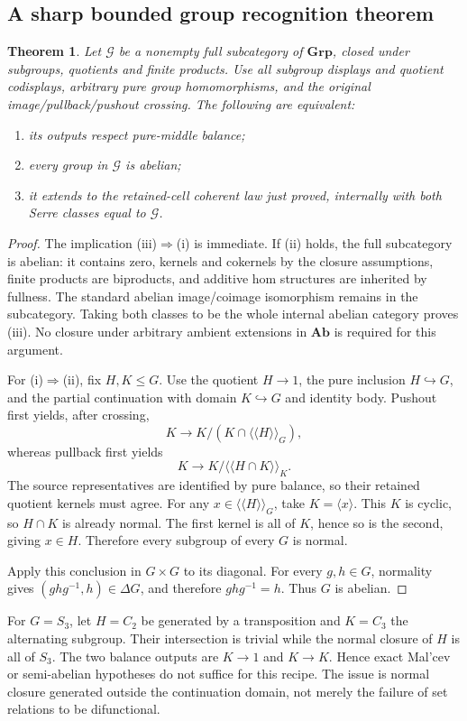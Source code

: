 \documentclass[11pt,a4paper]{article}
\newtheorem{theorem}{Theorem}[section]
\theoremstyle{definition}
\newcommand{\Ab}{\mathbf{Ab}}
\newcommand{\Grp}{\mathbf{Grp}}
\begin{document}
\subsection{A sharp bounded group recognition theorem}
\begin{theorem}\label{thm:groups}
Let $\mathcal G$ be a nonempty full subcategory of $\Grp$, closed under
subgroups, quotients and finite products. Use all subgroup displays and quotient
codisplays, arbitrary pure group homomorphisms, and the original
image/pullback/pushout crossing. The following are equivalent:
\begin{enumerate}[label=\textup{(\roman*)}]
\item its outputs respect pure-middle balance;
\item every group in $\mathcal G$ is abelian;
\item it extends to the retained-cell coherent law just proved, internally
with both Serre classes equal to $\mathcal G$.
\end{enumerate}
\end{theorem}
\begin{proof}
The implication (iii)$\Rightarrow$(i) is immediate. If (ii) holds, the full
subcategory is abelian: it contains zero, kernels and cokernels by the closure
assumptions, finite products are biproducts, and additive hom structures are
inherited by fullness. The standard abelian image/coimage isomorphism remains
in the subcategory. Taking both classes to be the whole internal abelian
category proves (iii). No closure under arbitrary ambient extensions in
$\Ab$ is required for this argument.

For (i)$\Rightarrow$(ii), fix $H,K\le G$. Use the quotient $H\to1$, the pure
inclusion $H\hookrightarrow G$, and the partial continuation with domain
$K\hookrightarrow G$ and identity body. Pushout first yields, after crossing,
\[
 K\longrightarrow K/(K\cap\langle\!\langle H\rangle\!\rangle_G),
\]
whereas pullback first yields
\[
 K\longrightarrow K/\langle\!\langle H\cap K\rangle\!\rangle_K.
\]
The source representatives are identified by pure balance, so their retained
quotient kernels must agree. For any
$x\in\langle\!\langle H\rangle\!\rangle_G$, take $K=\langle x\rangle$.
This $K$ is cyclic, so $H\cap K$ is already normal. The first kernel is all
of $K$, hence so is the second, giving $x\in H$. Therefore every subgroup of
every $G$ is normal.

Apply this conclusion in $G\times G$ to its diagonal. For every $g,h\in G$,
normality gives $(ghg^{-1},h)\in\Delta G$, and therefore $ghg^{-1}=h$.
Thus $G$ is abelian.
\end{proof}
For $G=S_3$, let $H=C_2$ be generated by a transposition and $K=C_3$ the
alternating subgroup. Their intersection is trivial while the normal closure
of $H$ is all of $S_3$. The two balance outputs are $K\to1$ and $K\to K$.
Hence exact Mal'cev or semi-abelian hypotheses do not suffice for this recipe.
The issue is normal closure generated outside the continuation domain, not
merely the failure of set relations to be difunctional.
\end{document}
